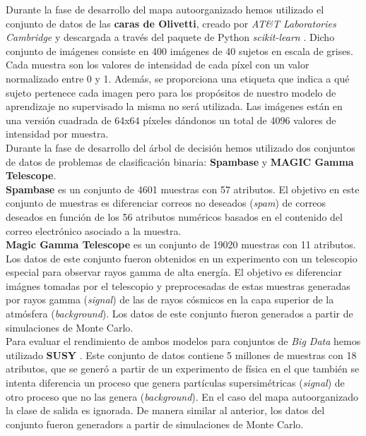 Durante la fase de desarrollo del mapa autoorganizado hemos utilizado el conjunto de datos de las \textbf{caras de Olivetti}, creado por \textit{AT\&T Laboratories Cambridge} y descargada a través del paquete de Python \textit{scikit-learn} \cite{olivetti}. Dicho conjunto de imágenes consiste en 400 imágenes de 40 sujetos en escala de grises. Cada muestra son los valores de intensidad de cada píxel con un valor normalizado entre 0 y 1. Además, se proporciona una etiqueta que indica a qué sujeto pertenece cada imagen pero para los propósitos de nuestro modelo de aprendizaje no supervisado la misma no será utilizada. Las imágenes están en una versión cuadrada de 64x64 píxeles dándonos un total de 4096 valores de intensidad por muestra. \\

Durante la fase de desarrollo del árbol de decisión hemos utilizado dos conjuntos de datos de problemas de clasificación binaria: \textbf{Spambase} y \textbf{MAGIC Gamma Telescope}.\\

\textbf{Spambase} \cite{spambase} es un conjunto de 4601 muestras con 57 atributos. El objetivo en este conjunto de muestras es diferenciar correos no deseados (\textit{spam}) de correos deseados en función de los 56 atributos numéricos basados en el contenido del correo electrónico asociado a la muestra.\\

\textbf{Magic Gamma Telescope} \cite{magic04} es un conjunto de 19020 muestras con 11 atributos. Los datos de este conjunto fueron obtenidos en un experimento con un telescopio especial para observar rayos gamma de alta energía. El objetivo es diferenciar imágnes tomadas por el telescopio y preprocesadas de estas muestras generadas por rayos gamma (\textit{signal}) de las de rayos cósmicos en la capa superior de la atmósfera (\textit{background}). Los datos de este conjunto fueron generados a partir de simulaciones de Monte Carlo.\\

Para evaluar el rendimiento de ambos modelos para conjuntos de \textit{Big Data} hemos utilizado \textbf{SUSY} \cite{susy}. Este conjunto de datos contiene 5 millones de muestras con 18 atributos, que se generó a partir de un experimento de física en el que también se intenta diferencia un proceso que genera partículas supersimétricas (\textit{signal}) de otro proceso que no las genera (\textit{background}). En el caso del mapa autoorganizado la clase de salida es ignorada. De manera similar al anterior, los datos del conjunto fueron generadors a partir de simulaciones de Monte Carlo.


